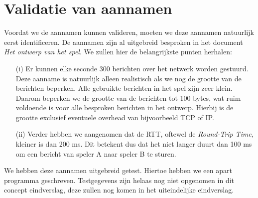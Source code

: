 \section{Validatie van aannamen}
Voordat we de aannamen kunnen valideren, moeten we deze aannamen natuurlijk eerst identificeren. De aannamen zijn al uitgebreid besproken in het document \emph{Het ontwerp van het spel}. We zullen hier de belangrijkste punten herhalen:
\begin{enumerate}
\item[(i)] Er kunnen elke seconde 300 berichten over het netwerk worden gestuurd. Deze aanname is natuurlijk alleen realistisch als we nog de grootte van de berichten beperken. Alle gebruikte berichten in het spel zijn zeer klein. Daarom beperken we de grootte van de berichten tot 100 bytes, wat ruim voldoende is voor alle besproken berichten in het ontwerp. Hierbij is de grootte exclusief eventuele overhead van bijvoorbeeld TCP of IP.
\item[(ii)] Verder hebben we aangenomen dat de RTT, oftewel de \emph{Round-Trip Time}, kleiner is dan 200 ms. Dit betekent dus dat het niet langer duurt dan 100 ms om een bericht van speler A naar speler B te sturen.
\end{enumerate}

We hebben deze aannamen uitgebreid getest. Hiertoe hebben we een apart programma geschreven. Testgegevens zijn helaas nog niet opgenomen in dit concept eindverslag, deze zullen nog komen in het uiteindelijke eindverslag.
